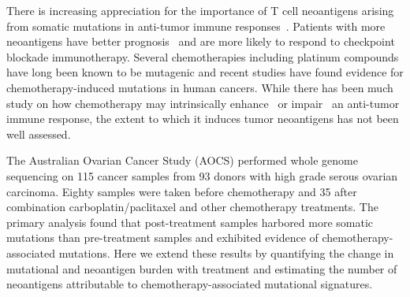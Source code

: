 There is increasing appreciation for the importance of T cell neoantigens arising from somatic mutations in anti-tumor immune responses~\cite{Schumacher_2015}. Patients with more neoantigens have better prognosis~\cite{Brown_2014} and are more likely to respond to checkpoint blockade immunotherapy\cite{Van_Allen_2015,Rizvi_2015}. Several chemotherapies including platinum compounds have long been known to be mutagenic\cite{Hannan_1989} and recent studies have found evidence for chemotherapy-induced mutations in human cancers\cite{Murugaesu_2015,Johnson_2013}. While there has been much study on how chemotherapy may intrinsically enhance~\cite{Hato_2012,Machiels2001,Hodge2013} or impair~\cite{Litterman_2013} an anti-tumor immune response, the extent to which it induces tumor neoantigens has not been well assessed.

The Australian Ovarian Cancer Study (AOCS) performed whole genome sequencing on 115 cancer samples from 93 donors with high grade serous ovarian carcinoma\cite{Patch_2015}. Eighty samples were taken before chemotherapy and 35 after combination carboplatin/paclitaxel and other chemotherapy treatments. The primary analysis found that post-treatment samples harbored more somatic mutations than pre-treatment samples and exhibited evidence of chemotherapy-associated mutations. Here we extend these results by quantifying the change in mutational and neoantigen burden with treatment and estimating the number of neoantigens attributable to chemotherapy-associated mutational signatures.

